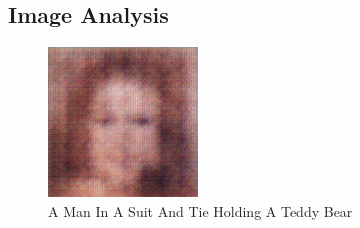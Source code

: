 \documentclass{article}%
\begin{document}
%
\subsection{Image Analysis}%
\label{subsec:ImageAnalysis}%


\begin{figure}[h!]%
\centering%
\includegraphics[width=150px]{500_fake_images/samples_5_266.png}%
\caption{A Man In A Suit And Tie Holding A Teddy Bear}%
\end{figure}

%
\end{document}

